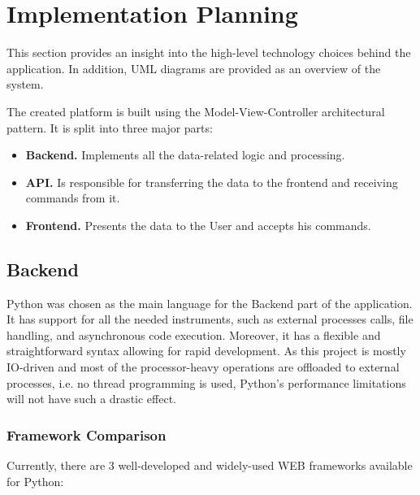 \chapter{Implementation Planning}\label{chap:planning}

This section provides an insight into the high-level technology choices behind the application.
In addition, UML diagrams are provided as an overview of the system.

The created platform is built using the Model-View-Controller \cite{mvc} architectural pattern.
It is split into three major parts:
\begin{itemize}
    \item \textbf{Backend.} Implements all the data-related logic and processing.
    \item \textbf{API.} Is responsible for transferring the data to the frontend and receiving commands from it.
    \item \textbf{Frontend.} Presents the data to the User and accepts his commands.
\end{itemize}


\section{Backend}
Python was chosen as the main language for the Backend part of the application.
It has support for all the needed instruments, such as external processes calls,
file handling, and asynchronous code execution. Moreover, it has a flexible and straightforward
syntax allowing for rapid development.
As this project is mostly IO-driven and most of the processor-heavy operations are offloaded to external processes,
i.e. no thread programming is used, Python's performance limitations\cite{gil} will not have such a drastic effect.

\subsection{Framework Comparison}
Currently, there are 3 well-developed and widely-used WEB frameworks available for Python:

